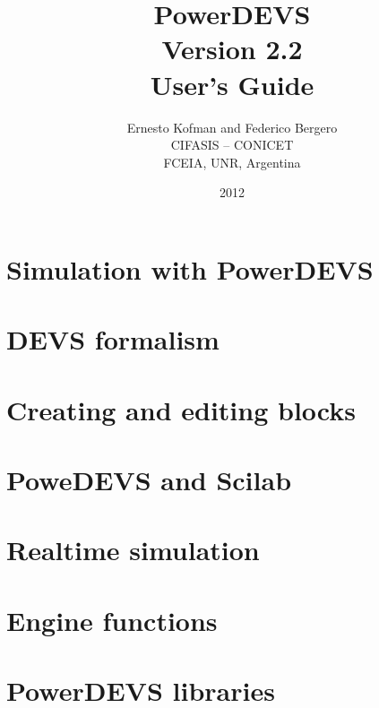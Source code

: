 \documentclass[a4paper,12pt]{book}
\title{\Huge{\textbf{PowerDEVS}}\\ \vspace{1cm} \large{Version 2.2} \\ \vspace{1cm} \huge{User's Guide}\vspace{2cm}}
\author{ Ernesto Kofman and Federico Bergero\vspace{2cm} \\ CIFASIS -- CONICET\\FCEIA, UNR, Argentina}
\date{2012}
\begin{document}
 \maketitle

 \tableofcontents





%





\chapter{Simulation with PowerDEVS}

\chapter{DEVS formalism}

\chapter{Creating and editing blocks}

\chapter{PoweDEVS and Scilab}

\chapter{Realtime simulation}

\appendix
\chapter{Engine functions}

\chapter{PowerDEVS libraries}
\end{document}
